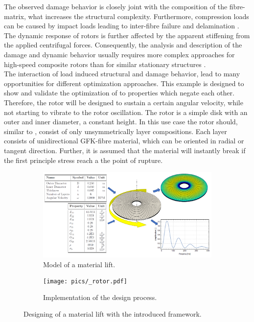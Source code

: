 The observed damage behavior is closely joint with the composition of the fibre-matrix, 
what increases the structural complexity.
Furthermore, compression loads can be caused by impact loads leading to inter-fibre failure and delamination \cite{Boehm2010, Thieme2014, Hufenbach2006}.
The dynamic response of rotors is further affected by the apparent stiffening from
the applied centrifugal forces. 
Consequently, the analysis and description of the damage
and dynamic behavior usually requires more complex approaches for high-speed composite
rotors than for similar stationary structures \cite{filippatos_damage_2017}.\\
The interaction of load induced structural and damage behavior, lead to many opportunities for different optimization approaches. 
This example is designed to show and validate the optimization of to properties which negate each other.
Therefore, the rotor will be designed to sustain a certain angular velocity, while not starting to vibrate to the rotor oscillation.
The rotor is a simple disk with an outer and inner diameter, a constant height.
In this use case the rotor should, similar to \cite{Filippatos2021}, consist of only unsymmetrically layer compositions.
Each layer consists of unidirectional GFK-fibre material,
which can be oriented in radial or tangent direction.
Further, it is assumed that the material will instantly break if the first principle stress reach a the point of rupture.
\begin{figure}[h]
    \centering
    \begin{subfigure}[b]{0.85\textwidth}
        \centering
        \includegraphics[width=\textwidth]{pics/rotor_model.png}
        \caption{\label{pic:rotor_model} Model of a material lift.}
    \end{subfigure}
    \hfill
    \begin{subfigure}[b]{0.95\textwidth}
        \centering
        \texttt{[image: pics/\_rotor.pdf]}
        \caption{\label{pic:rotor_solution} Implementation of the design process.}
    \end{subfigure}
    \caption{\label{pic:rotor} Designing of a material lift with the introduced framework.}
\end{figure}\\

